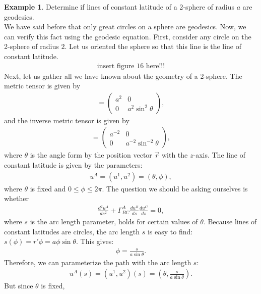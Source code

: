 \documentclass{article}
\theoremstyle{definition}
\newtheorem{exmp}{Example}[section]
\begin{document}
\begin{exmp}
	Determine if lines of constant latitude of a 2-sphere of radius $a$ are geodesics.\\
	
	We have said before that only great circles on a sphere are geodesics. Now, we can verify this fact using the geodesic equation. First, consider any circle on the 2-sphere of radius $2$. Let us oriented the sphere so that this line is the line of constant latitude. 
	\begin{align*}
		\text{insert figure 16 here!!!}
	\end{align*}
	Next, let us gather all we have known about the geometry of a 2-sphere. The metric tensor is given by
	\begin{align*}
	[g_{AB}] = \begin{pmatrix}
	a^2 & 0 \\
	0 & a^2\sin^2\theta
	\end{pmatrix},
	\end{align*}
	and the inverse metric tensor is given by
	\begin{align*}
	[g^{AB}] = \begin{pmatrix}
	a^{-2} & 0\\
	0 & a^{-2}\sin^{-2}\theta
	\end{pmatrix},
	\end{align*}
	where $\theta$ is the angle form by the position vector $\vec{r}$ with the $z$-axis. The line of constant latitude is given by the parameters:
	\begin{align*}
	u^A = (u^1,u^2) = (\theta,\phi),
	\end{align*}
	where $\theta$ is fixed and $0 \leq \phi \leq 2\pi$. The question we should be asking ourselves is whether
	\begin{align*}
	\frac{d^2u^A}{ds^2} + \Gamma^{A}_{BC}\frac{du^B}{ds}\frac{du^C}{ds} = 0,
	\end{align*}
	where $s$ is the arc length parameter, holds for certain values of $\theta$. Because lines of constant latitudes are circles, the arc length $s$ is easy to find: $s(\phi) = r'\phi = a\phi\sin\theta$. This gives:
	\begin{align*}
	\phi = \frac{s}{a\sin\theta}.
	\end{align*}
	Therefore, we can parameterize the path with the arc length $s$:
	\begin{align*}
	u^A(s) = (u^1,u^2)(s) = \left(\theta, \frac{s}{a\sin\theta}\right).
	\end{align*}
	But since $\theta$ is fixed,

\end{exmp}
\end{document}
